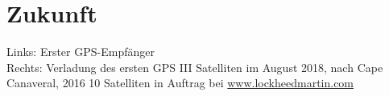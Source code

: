 \section{Zukunft}
\label{sec:zukunft}

Links: Erster GPS-Empfänger \\
Rechts: Verladung des ersten GPS III Satelliten im August 2018, nach Cape Canaveral, 2016 10 Satelliten in Auftrag bei \url{www.lockheedmartin.com}
